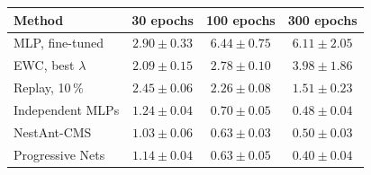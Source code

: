\begin{tabular}{@{}lccc@{}}
\toprule
Method & 30 epochs & 100 epochs & 300 epochs \\
\midrule
MLP, fine-tuned & $2.90\pm0.33$ & $6.44\pm0.75$ & $6.11\pm2.05$ \\
EWC, best $\lambda$ & $2.09\pm0.15$ & $2.78\pm0.10$ & $3.98\pm1.86$ \\
Replay, 10\,\% & $2.45\pm0.06$ & $2.26\pm0.08$ & $1.51\pm0.23$ \\
Independent MLPs & $1.24\pm0.04$ & $0.70\pm0.05$ & $0.48\pm0.04$ \\
NestAnt-CMS & $1.03\pm0.06$ & $0.63\pm0.03$ & $0.50\pm0.03$ \\
Progressive Nets & $1.14\pm0.04$ & $0.63\pm0.05$ & $0.40\pm0.04$ \\
\bottomrule
\end{tabular}
